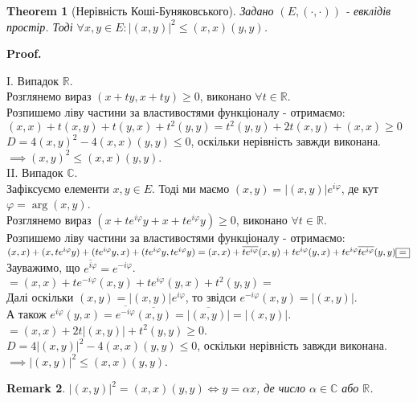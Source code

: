 \documentclass[a4paper, 10pt]{article}
\makeatletter
\theoremstyle{theoremdd}
\newtheorem{theorem}{Theorem}[subsection]
\newtheorem{remark}[theorem]{Remark}
\renewenvironment{proof}[1][Proof.\\]{\par
\pushQED{\hfill \qed}%
\normalfont \topsep6\p@\@plus6\p@\relax
\trivlist
\item\relax
{\bfseries
#1\@addpunct{.}}\hspace\labelsep\ignorespaces
}{%
\popQED\endtrivlist\@endpefalse
}
\makeatother
\begin{document}
\begin{theorem}[Нерівність Коші-Буняковського]
Задано $(E, (\cdot , \cdot))$ - евклідів простір. Тоді $\forall x,y \in E: |(x,y)|^2 \leq (x,x)(y,y)$.
\end{theorem}

\begin{proof}
I. Випадок $\mathbb{R}$.\\
Розглянемо вираз $(x+ty, x+ty) \geq 0$, виконано $\forall t \in \mathbb{R}$.\\
Розпишемо ліву частини за властивостями функціоналу - отримаємо:\\
$(x,x) + t(x,y) + t(y,x) + t^2(y,y) = t^2(y,y) + 2t(x,y) + (x,x) \geq 0$\\
$D = 4(x,y)^2 - 4(x,x)(y,y) \leq 0$, оскільки нерівність завжди виконана.\\
$\implies (x,y)^2 \leq (x,x)(y,y)$.
\bigskip \\
II. Випадок $\mathbb{C}$.\\
Зафіксуємо елементи $x,y \in E$. Тоді ми маємо $(x,y) = |(x,y)|e^{i \varphi}$, де кут $\varphi = \arg (x,y)$.\\
Розглянемо вираз $(x+te^{i\varphi}y + x + t e^{i\varphi}y) \geq 0$, виконано $\forall t \in \mathbb{R}$.\\
Розпишемо ліву частини за властивостями функціоналу - отримаємо:\\
$(x,x)+(x,te^{i\varphi}y) + (te^{i\varphi}y,x)+(te^{i\varphi}y, te^{i\varphi}y)
= (x,x) + \overline{t e^{i\varphi}}(x,y) + te^{i \varphi} (y,x) + te^{i \varphi} \overline{t e^{i\varphi}} (y,y) \boxed{=} \\ $
Зауважимо, що $\overline{e^{i\varphi}} = e^{-i\varphi}$.\\
$\boxed{=} (x,x) + te^{-i\varphi}(x,y) + te^{i\varphi}(y,x) + t^2(y,y) \boxed{=}$\\
Далі оскільки $(x,y) = |(x,y)|e^{i \varphi}$, то звідси $e^{-i \varphi}(x,y) = |(x,y)|$.\\
А також $e^{i\varphi}(y,x) = \overline{e^{-i\varphi}} \overline{(x,y)} = \overline{|(x,y)|} = |(x,y)|$.\\
$\boxed{=} (x,x) + 2t|(x,y)| + t^2(y,y) \geq 0$.\\
$D = 4|(x,y)|^2 - 4(x,x)(y,y) \leq 0$, оскільки нерівність завжди виконана.\\
$\implies |(x,y)|^2 \leq (x,x)(y,y)$.
\end{proof}

\begin{remark}
$|(x,y)|^2 = (x,x)(y,y) \iff y = \alpha x$, де число $\alpha \in \mathbb{C}$ або $\mathbb{R}$.
\end{remark}
\end{document}
